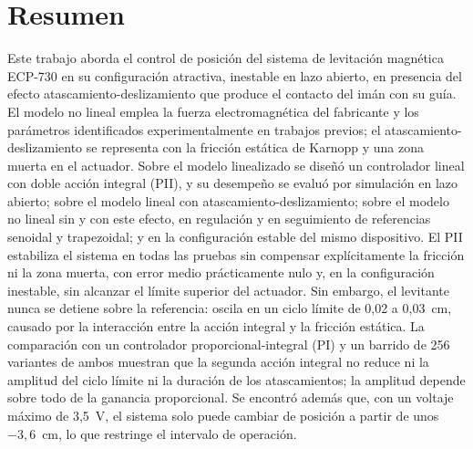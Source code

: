 \chapter*{Resumen}\label{Chap:Resumen}

Este trabajo aborda el control de posición del sistema de levitación magnética ECP-730 en su configuración atractiva, inestable en lazo abierto, en presencia del efecto atascamiento-deslizamiento que produce el contacto del imán con su guía. El modelo no lineal emplea la fuerza electromagnética del fabricante y los parámetros identificados experimentalmente en trabajos previos; el atascamiento-deslizamiento se representa con la fricción estática de Karnopp y una zona muerta en el actuador. Sobre el modelo linealizado se diseñó un controlador lineal con doble acción integral (PII), y su desempeño se evaluó por simulación en lazo abierto; sobre el modelo lineal con atascamiento-deslizamiento; sobre el modelo no lineal sin y con este efecto, en regulación y en seguimiento de referencias senoidal y trapezoidal; y en la configuración estable del mismo dispositivo. El PII estabiliza el sistema en todas las pruebas sin compensar explícitamente la fricción ni la zona muerta, con error medio prácticamente nulo y, en la configuración inestable, sin alcanzar el límite superior del actuador. Sin embargo, el levitante nunca se detiene sobre la referencia: oscila en un ciclo límite de 0,02 a 0,03~cm, causado por la interacción entre la acción integral y la fricción estática. La comparación con un controlador proporcional-integral (PI) y un barrido de 256 variantes de ambos muestran que la segunda acción integral no reduce ni la amplitud del ciclo límite ni la duración de los atascamientos; la amplitud depende sobre todo de la ganancia proporcional. Se encontró además que, con un voltaje máximo de 3,5~V, el sistema solo puede cambiar de posición a partir de unos $-3{,}6$~cm, lo que restringe el intervalo de operación.
